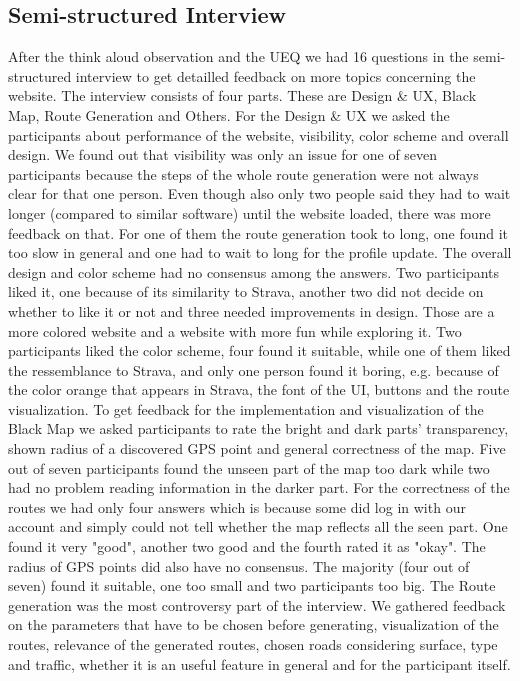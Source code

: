 \documentclass{sigchi}
\begin{document}
\subsection{Semi-structured Interview}
After the think aloud observation and the UEQ we had 16 questions in the semi-structured interview to get detailled feedback on more topics concerning the website.
The interview consists of four parts. These are Design & UX, Black Map, Route Generation and Others. 
For the Design & UX we asked the participants about performance of the website, visibility, color scheme and overall design. We found out that visibility was only an issue for one of seven participants because the steps of the whole route generation were not always clear for that one person. Even though also only two people said they had to wait longer (compared to similar software) until the website loaded, there was more feedback on that. For one of them the route generation took to long, one found it too slow in general and one had to wait to long for the profile update.
The overall design and color scheme had no consensus among the answers. Two participants liked it, one because of its similarity to Strava, another two did not decide on whether to like it or not and three needed improvements in design. Those are a more colored website and a website with more fun while exploring it.
Two participants liked the color scheme, four found it suitable, while one of them liked the ressemblance to Strava, and only one person found it boring, e.g. because of the color orange that appears in Strava, the font of the UI, buttons and the route visualization.
To get feedback for the implementation and visualization of the Black Map we asked participants to rate the bright and dark parts' transparency, shown radius of a discovered GPS point and general correctness of the map. 
Five out of seven participants found the unseen part of the map too dark while two had no problem reading information in the darker part.
For the correctness of the routes we had only four answers which is because some did log in with our account and simply could not tell whether the map reflects all the seen part. One found it very "good", another two good and the fourth rated it as "okay".
The radius of GPS points did also have no consensus. The majority (four out of seven) found it suitable, one too small and two participants too big.
The Route generation was the most controversy part of the interview. We gathered feedback on the parameters that have to be chosen before generating, visualization of the routes, relevance of the generated routes, chosen roads considering surface, type and traffic, whether it is an useful feature in general and for the participant itself.
\end{document}
